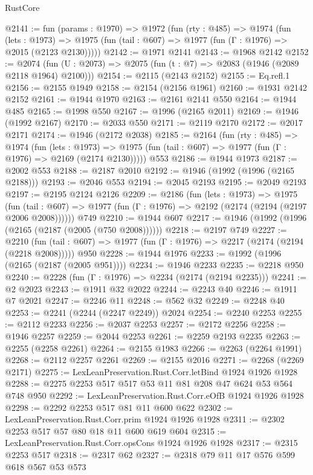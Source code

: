 \begin{lexlean}{RustCore}
\begin{coremodule}
@2141 := fun (params : @1970) =>
  @1972
    (fun (rty : @485) =>
    @1974
      (fun (lets : @1973) =>
      @1975 (fun (tail : @607) => @1977 (fun (Γ : @1976) => @2015 (@2123 @2130)))))
@2142 := @1971 @2141
@2143 := @1968 @2142
@2152 := @2074 (fun (U : @2073) => @2075 (fun (t : @7) => @2083 (@1946 (@2089 @2118 @1964) @2100)))
@2154 := @2115 (@2143 @2152)
@2155 := Eq.refl.{1}
@2156 := @2155 @1949
@2158 := @2154 (@2156 @1961)
@2160 := @1931 @2142 @2152
@2161 := @1944 @1970
@2163 := @2161 @2141 @550
@2164 := @1944 @485
@2165 := @1998 @550
@2167 := @1996 (@2165 @2011)
@2169 := @1946 (@1992 @2167)
@2170 := @2033 @550
@2171 := @2119 @2170
@2172 := @2017 @2171
@2174 := @1946 (@2172 @2038)
@2185 := @2164
    (fun (rty : @485) =>
    @1974
      (fun (lets : @1973) =>
      @1975 (fun (tail : @607) => @1977 (fun (Γ : @1976) => @2169 (@2174 @2130)))))
    @553
@2186 := @1944 @1973
@2187 := @2002 @553
@2188 := @2187 @2010
@2192 := @1946 (@1992 (@1996 (@2165 @2188)))
@2193 := @2046 @553
@2194 := @2045 @2193
@2195 := @2049 @2193
@2197 := @2195 @2124 @2126
@2209 := @2186
    (fun (lets : @1973) =>
    @1975
      (fun (tail : @607) => @1977 (fun (Γ : @1976) => @2192 (@2174 (@2194 (@2197 @2006 @2008))))))
    @749
@2210 := @1944 @607
@2217 := @1946 (@1992 (@1996 (@2165 (@2187 (@2005 (@750 @2008))))))
@2218 := @2197 @749
@2227 := @2210
    (fun (tail : @607) => @1977 (fun (Γ : @1976) => @2217 (@2174 (@2194 (@2218 @2008)))))
    @950
@2228 := @1944 @1976
@2233 := @1992 (@1996 (@2165 (@2187 (@2005 @951))))
@2234 := @1946 @2233
@2235 := @2218 @950
@2240 := @2228 (fun (Γ : @1976) => @2234 (@2174 (@2194 @2235)))
@2241 := @2 @2023
@2243 := @1911 @32 @2022
@2244 := @2243 @40
@2246 := @1911 @7 @2021
@2247 := @2246 @11
@2248 := @562 @32
@2249 := @2248 @40
@2253 := @2241 (@2244 (@2247 @2249)) @2024
@2254 := @2240 @2253
@2255 := @2112 @2233
@2256 := @2037 @2253
@2257 := @2172 @2256
@2258 := @1946 @2257
@2259 := @2044 @2253
@2261 := @2259 @2193 @2235
@2263 := @2255 (@2258 @2261)
@2264 := @2155 @1983
@2266 := @2263 (@2264 @1991)
@2268 := @2112 @2257 @2261
@2269 := @2155 @2016
@2271 := @2268 (@2269 @2171)
@2275 := LexLeanPreservation.Rust.Corr.letBind @1924 @1926 @1928
@2288 := @2275 @2253 @517 @517 @53 @11 @81 @208 @47 @624 @53 @564 @748 @950
@2292 := LexLeanPreservation.Rust.Corr.eOfB @1924 @1926 @1928
@2298 := @2292 @2253 @517 @81 @11 @600 @622
@2302 := LexLeanPreservation.Rust.Corr.prim @1924 @1926 @1928
@2311 := @2302 @2253 @517 @57 @80 @18 @11 @600 @619 @604
@2315 := LexLeanPreservation.Rust.Corr.opsCons @1924 @1926 @1928
@2317 := @2315 @2253 @517
@2318 := @2317 @62
@2327 := @2318 @79 @11 @17 @576 @599 @618 @567 @53 @573

\end{coremodule}
\end{lexlean}
